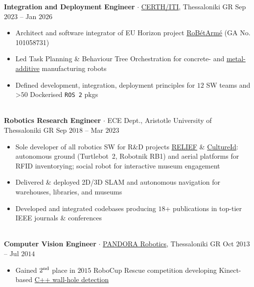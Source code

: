 \documentclass[a4paper,10pt,twoside]{article}
\begin{document}
  \noindent\textbf{Integration and Deployment Engineer} $\cdot$ \href{https://robotics.iti.gr/en/home/}{CERTH/ITI}, Thessaloniki GR \hfill {\small \textcolor{agray}{Sep $2023$ -- Jan $2026$}} \\
  \begin{minipage}[t]{\textwidth}
    \begin{itemize}
      \item Architect and software integrator of EU Horizon project \href{https://www.robetarme-project.eu/sobre/}{RoBétArmé} (GA No. 101058731)\verticalspaceafteritem
    \item Led Task Planning \& Behaviour Tree Orchestration for concrete- and \href{https://www.youtube.com/watch?v=xuIbOL-MPRk}{metal-additive} manufacturing robots\verticalspaceafteritem
    \item Defined development, integration, deployment principles for $12$ SW teams and >$50$ Dockerised \texttt{ROS~2} pkgs
    \end{itemize}
  \end{minipage} \\[-0.2em]

  \noindent\textbf{Robotics Research Engineer} $\cdot$ ECE Dept., Aristotle University of Thessaloniki GR \hfill {\small \textcolor{agray}{Sep $2018$ -- Mar $2023$}} \\
  \begin{minipage}[t]{\textwidth}
    \begin{itemize}
      \item Sole developer of all robotics SW for R\&D projects \href{https://relief.web.auth.gr/language/en/home/\#pg-72-1}{RELIEF} \& \href{https://cultureid.web.auth.gr/?page\_id=200&lang=en}{CultureId}: autonomous ground (Turtlebot~2, Robotnik RB1) and aerial platforms for RFID inventorying; social robot for interactive museum engagement\verticalspaceafteritem
      \item Delivered \& deployed 2D/3D SLAM and autonomous navigation for warehouses, libraries, and museums \verticalspaceafteritem
      \item Developed and integrated codebases producing $18$+ publications in top-tier IEEE journals \& conferences
    \end{itemize}
  \end{minipage} \\[-0.2em]

\noindent \textbf{Computer Vision Engineer} $\cdot$ \href{https://issel.ee.auth.gr/pandora-robotics/}{PANDORA Robotics}, Thessaloniki GR \hfill {\small \textcolor{agray}{Oct $2013$ -- Jul $2014$}}
  \begin{minipage}[t]{\textwidth}
    \begin{itemize}
      \item Gained $2^{\textnormal{nd}}$ place in $2015$ RoboCup Rescue competition developing Kinect-based  \href{https://github.com/li9i/pandora\_vision\_2014}{C++ wall-hole detection}
    \end{itemize}
  \end{minipage} \\ [-0.8em]
\end{document}
